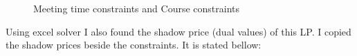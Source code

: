 \documentclass[paper=letter, fontsize=11pt]{scrartcl} %
\begin{document}
\begin{figure}[H]
  
  \centering
    \caption{Meeting time constraints and Course constraints}
\end{figure}

Using excel solver I also found the shadow price (dual values) of this LP. I copied the shadow prices beside the constraints. It is stated bellow:
\end{document}
